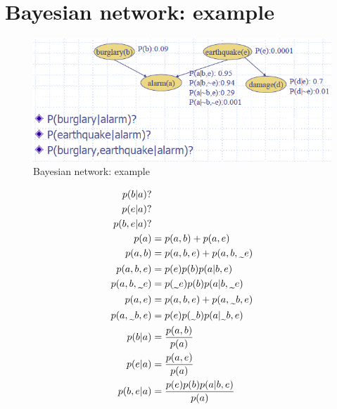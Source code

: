 \documentclass{article}
\newcommand{\midtilde}{\raisebox{-0.25\baselineskip}{\textasciitilde}}
\begin{document}
\section*{Bayesian network: example}
\begin{figure}[H]
 \centering 
\includegraphics[scale=0.65]{images/alarm.png} 
 \caption{Bayesian network: example}
 \label{fig:b-net-example}
\end{figure}

\begin{align*}
p(b|a) ? & \\
p(e|a) ? & \\
p(b,e|a) ? & \\
p(a) & = p(a,b) + p(a,e) \\
p(a,b) & = p(a,b,e) + p(a,b,\midtilde e) \\
p(a,b,e) & = p(e)p(b)p(a|b,e) \\
p(a,b,\midtilde e) & = p(\midtilde e)p(b)p(a|b,\midtilde e) \\
p(a,e) & = p(a,b,e) + p(a,\midtilde b,e) \\
p(a,\midtilde b,e) & = p(e)p(\midtilde b)p(a|\midtilde b,e) \\
p(b|a) & = \frac{p(a,b)}{p(a)} \\
p(e|a) & = \frac{p(a,e)}{p(a)} \\
p(b,e|a) & = \frac{p(e)p(b)p(a|b,e)}{p(a)} \\
\end{align*}
\end{document}
